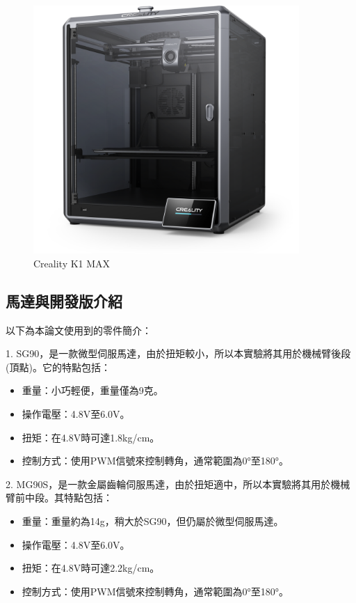 \documentclass[class=NCU_thesis, crop=false]{standalone}
\begin{document}
\begin{figure}[htbp]
    \centering
    \includegraphics[width=0.9\textwidth]{figures/creality-k1-max.png}
\caption{Creality K1 MAX}
\end{figure}

\subsection{馬達與開發版介紹}
以下為本論文使用到的零件簡介：

1. SG90，是一款微型伺服馬達，由於扭矩較小，所以本實驗將其用於機械臂後段(頂點)。它的特點包括：
\begin{itemize}
	\item 重量：小巧輕便，重量僅為9克。
	\item 操作電壓：4.8V至6.0V。
	\item 扭矩：在4.8V時可達1.8kg/cm。
	\item 控制方式：使用PWM信號來控制轉角，通常範圍為0°至180°。
\end{itemize}

2. MG90S，是一款金屬齒輪伺服馬達，由於扭矩適中，所以本實驗將其用於機械臂前中段。其特點包括：
\begin{itemize}
	\item 重量：重量約為14g，稍大於SG90，但仍屬於微型伺服馬達。
	\item 操作電壓：4.8V至6.0V。
	\item 扭矩：在4.8V時可達2.2kg/cm。
	\item 控制方式：使用PWM信號來控制轉角，通常範圍為0°至180°。
\end{itemize}
\end{document}
